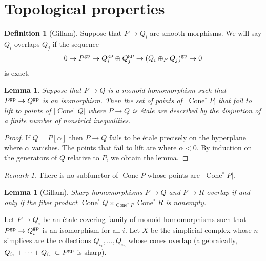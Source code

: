 \documentclass[12pt]{amsart}
\newtheorem{lemma}[theorem]{Lemma}
\theoremstyle{definition}
\newtheorem{definition}[theorem]{Definition}
\theoremstyle{remark}
\newtheorem{remark}[theorem]{Remark}
\def\Cone{\operatorname{Cone}}
\begin{document}
\section{Topological properties}

\begin{definition}[Gillam]
Suppose that $P \to Q_i$ are smooth morphisms.  We will say $Q_i$ overlaps $Q_j$ if the sequence
\begin{equation*}
0 \to P^{\rm gp} \to Q_i^{\rm gp} \oplus Q_j^{\rm gp} \to (Q_i \oplus_P Q_j)^{\rm gp} \to 0
\end{equation*}
is exact.
\end{definition}

\begin{lemma}
Suppose that $P \to Q$ is a monoid homomorphism such that $P^{\rm gp} \to Q^{\rm gp}$ is an isomorphism.  Then the set of points of $|\Cone^\circ P|$ that fail to lift to points of $|\Cone^\circ Q|$ where $P \to Q$ is \'etale are described by the disjuntion of a finite number of nonstrict inequalities. 
\end{lemma}
\begin{proof}
If $Q = P[\alpha]$ then $P \to Q$ fails to be \'etale precisely on the hyperplane where $\alpha$ vanishes.  The points that fail to lift are where $\alpha < 0$.  By induction on the generators of $Q$ relative to $P$, we obtain the lemma.
\end{proof}

\begin{remark}
There is no subfunctor of $\Cone P$ whose points are $|\Cone^\circ P|$.
\end{remark}

\begin{lemma}[Gillam]
Sharp homomorphisms $P \to Q$ and $P \to R$ overlap if and only if the fiber product $\Cone^\circ Q \mathop\times_{\Cone^\circ P} \Cone^\circ R$ is nonempty.
\end{lemma}

Let $P \to Q_i$ be an \'etale covering family of monoid homomorphisms such that $P^{\rm gp} \to Q_i^{\rm gp}$ is an isomorphism for all $i$.  Let $X$ be the simplicial complex whose $n$-simplices are the collections $Q_{i_1}, \ldots, Q_{i_n}$ whose cones overlap (algebraically, $Q_{i_1} + \cdots + Q_{i_n} \subset P^{\rm gp}$ is sharp).
\end{document}
